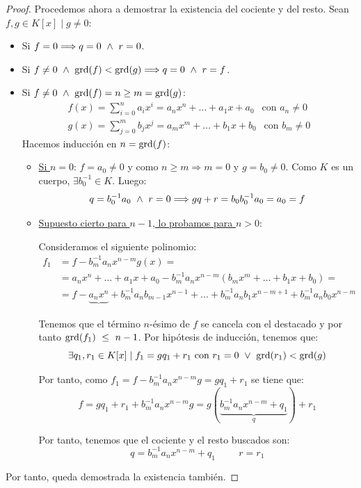 \begin{proof}
    Procedemos ahora a demostrar la existencia del cociente y del resto. Sean $f,g \in K[x] \mid g\neq 0$:
    \begin{itemize}
        \item Si $f=0 \Longrightarrow q=0 \ \land \  r= 0$.
        \item Si $f \neq 0 \ \land \  \operatorname{grd}(f) < \operatorname{grd}(g) \Longrightarrow q=0 \ \land \  r = f$.
        \item Si $f\neq 0\ \land \  \operatorname{grd}(f) = n \geq m = \operatorname{grd}(g)$:
        \begin{gather*}
            f(x) = \sum_{i=0}^n a_ix^i = a_nx^n + \ldots + a_1x + a_0~~\text{ con } a_n \neq 0 \\
            g(x) = \sum_{j=0}^m b_jx^j = a_mx^m + \ldots + b_1x + b_0~~\text{ con } b_m \neq 0
        \end{gather*}
        Hacemos inducción en $n = \operatorname{grd}(f)$:
        \begin{itemize}
            \item \ul{Si $n=0$}: $f=a_0 \neq 0$ y como $n \geq m \Longrightarrow m = 0$ y $g = b_0 \neq 0$.
            Como $K$ es un cuerpo, $\exists b_0^{-1} \in K$. Luego:
            $$q=b_0^{-1}a_0 \ \land \  r=0 \Longrightarrow gq+r = b_0 b_0^{-1} a_0 = a_0 = f$$
    
            \item \ul{Supuesto cierto para $n-1$, lo probamos para $n>0$}:
            
            Consideramos el siguiente polinomio:
            \begin{equation*}
                \begin{split}
                    f_1 &= f-b_m^{-1}a_n x^{n-m}g(x) =\\
                    & = a_nx^n + \ldots + a_1x + a_0 - b_m^{-1} a_n x^{n-m} (b_mx^m + \ldots + b_1x + b_0) =\\
                    & = f-\underbrace{a_nx^n} + b_m^{-1} a_n b_{m-1} x^{n-1} + \ldots + b_m^{-1}a_nb_1x^{n-m+1} + b_m^{-1}a_nb_0x^{n-m}
                \end{split}
            \end{equation*}
            
            Tenemos que el término $n$-ésimo de $f$ se cancela con el destacado y por tanto $\operatorname{grd}(f_1)~\leq~n-1$.
            Por hipótesis de inducción, tenemos que:
            $$\exists q_1,r_1 \in K[x] \mid f_1 = gq_1 + r_1 \text{ con } r_1=0 \ \lor \  \operatorname{grd}(r_1) < \operatorname{grd}(g)$$
    
            Por tanto, como $f_1=f-b_m^{-1}a_nx^{n-m}g = gq_1+r_1$ se tiene que:
            \begin{equation*}
                f= gq_1+r_1 + b_m^{-1}a_nx^{n-m}g =g(\underbrace{b_m^{-1}a_nx^{n-m}+q_1}_q)+r_1
            \end{equation*}
            
            Por tanto, tenemos que el cociente y el resto buscados son: $$q = b_m^{-1}a_nx^{n-m} + q_1 \hspace{1cm} r=r_1$$
        \end{itemize}
    \end{itemize}
    Por tanto, queda demostrada la existencia también.
\end{proof}

